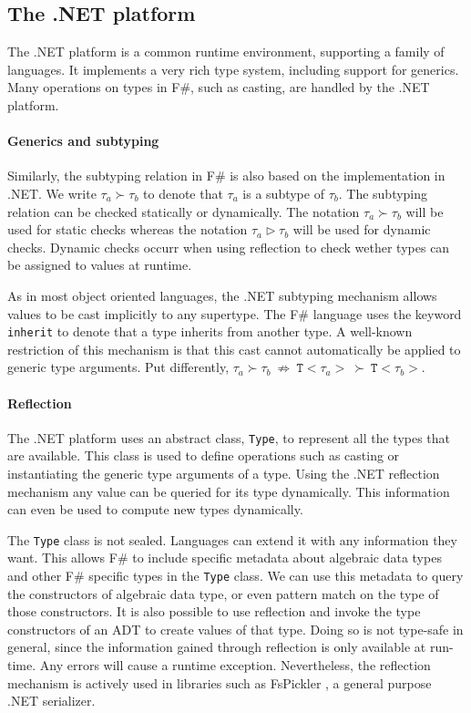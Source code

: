 \documentclass{sigplanconf}
\begin{document}
\subsection{The .NET platform}
The .NET platform is a common runtime environment, supporting
a family of languages. It implements a very rich type
system, including support for generics. Many operations on types
in F\#, such as casting, are handled by the .NET platform. 

\paragraph{Generics and subtyping}

Similarly, the subtyping relation in F\# is also based on the
implementation in .NET.  We write $\tau_a \succ \tau_b$ to denote that
$\tau_a$ is a subtype of $\tau_b$. The subtyping relation can be
checked statically or dynamically. The notation $\tau_a \succ \tau_b$
will be used for static checks whereas the notation $\tau_a \triangleright \tau_b$
will be used for dynamic checks. Dynamic checks occurr when using reflection
to check wether types can be assigned to values at runtime.

As in most object oriented languages, the .NET subtyping mechanism
allows values to be cast implicitly to any supertype.  The F\#
language uses the keyword \verb+inherit+ to denote that a type
inherits from another type. A well-known restriction of this mechanism
is that this cast cannot automatically be applied to generic type
arguments. Put differently, $\tau_a \succ \tau_b\ \not\Rightarrow\
\mathtt{T}{<}\tau_a{>} \ \succ \ \mathtt{T}{<}\tau_b{>}$.

\paragraph{Reflection}

The .NET platform uses an abstract class, \verb+Type+, to represent
all the types that are available. This class is used to define
operations such as casting or instantiating the generic type arguments
of a type. Using the .NET reflection mechanism any value can be
queried for its type dynamically. This information can even be used to
compute new types dynamically.

The \verb+Type+ class is not sealed. Languages can extend it with any
information they want. This allows F\# to include specific metadata
about algebraic data types and other F\# specific types in the
\verb+Type+ class.  We can use this metadata to query the constructors
of algebraic data type, or even pattern match on the type of those
constructors. It is also possible to use reflection and invoke the
type constructors of an ADT to create values of that type. Doing
so is not type-safe in general, since the information gained through
reflection is only available at run-time. Any errors will cause a
runtime exception. Nevertheless, the reflection mechanism is actively
used in libraries such as FsPickler \cite{FsPickler}, a general
purpose .NET serializer.
\end{document}
